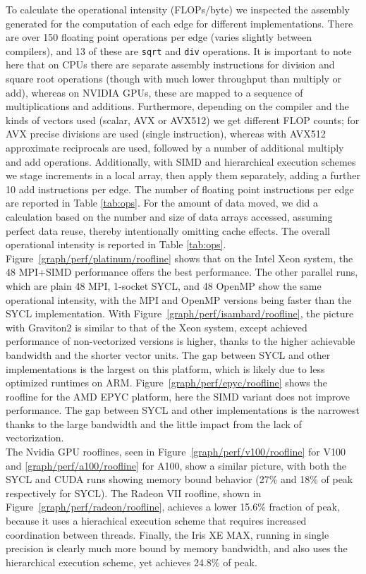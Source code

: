 \documentclass[runningheads]{llncs}
\begin{document}
To calculate the operational intensity (FLOPs/byte) we inspected the assembly 
generated for the computation of each edge for different implementations. There 
are over 150 floating point operations per edge (varies slightly between 
compilers), and 13 of these are \texttt{sqrt} and \texttt{div} operations. It 
is important to note here that on CPUs there are separate assembly instructions 
for division and square root operations (though with much lower throughput than 
multiply or add), whereas on NVIDIA GPUs, these are mapped to a sequence of 
multiplications and additions. Furthermore, depending on the compiler and the 
kinds of vectors used (scalar, AVX or AVX512) we get different FLOP counts; for 
AVX precise divisions are used (single instruction), whereas with AVX512 
approximate reciprocals are used, followed by a number of additional multiply 
and add operations. Additionally, with SIMD and hierarchical execution schemes 
we stage increments in a local array, then apply them separately, adding a 
further 10 add instructions per edge. The number of floating point instructions 
per edge are reported in Table \ref{tab:ops}. For the amount of data moved, we 
did a calculation based on the number and size of data arrays accessed, assuming 
perfect data reuse, thereby intentionally omitting cache effects. The overall 
operational intensity is reported in Table \ref{tab:ops}.\\
\indent Figure~\ref{graph/perf/platinum/roofline} shows that on the Intel Xeon 
system, the 48 MPI+SIMD performance offers the best performance. The other 
parallel runs, which are plain 48 MPI, 1-socket SYCL, and 48 OpenMP show the 
same operational intensity, with the MPI and OpenMP versions being faster than 
the SYCL implementation. With Figure~\ref{graph/perf/isambard/roofline}, the 
picture with Graviton2 is similar to that of the Xeon system, except achieved 
performance of non-vectorized versions is higher, thanks to the higher 
achievable bandwidth and the shorter vector units. The gap between SYCL and 
other implementations is the largest on this platform, which is likely due to 
less optimized runtimes on ARM. Figure~\ref{graph/perf/epyc/roofline} shows the 
roofline for the AMD EPYC platform, here the SIMD variant does not improve 
performance. The gap between SYCL and other implementations is the narrowest 
thanks to the large bandwidth and the little impact from the lack of 
vectorization.\\
\indent The Nvidia GPU rooflines, seen in Figure~\ref{graph/perf/v100/roofline} 
for V100 and \ref{graph/perf/a100/roofline} for A100, show a similar picture, 
with both the SYCL and CUDA runs showing memory bound behavior (27\% and 18\% 
of peak respectively for SYCL). The Radeon VII roofline, shown in 
Figure~\ref{graph/perf/radeon/roofline}, achieves a lower 15.6\% fraction of 
peak, because it uses a hierachical execution scheme that requires increased 
coordination between threads. Finally, the Iris XE MAX, running in single 
precision is clearly much more bound by memory bandwidth, and also uses the 
hierarchical execution scheme, yet achieves 24.8\% of peak.
\end{document}
